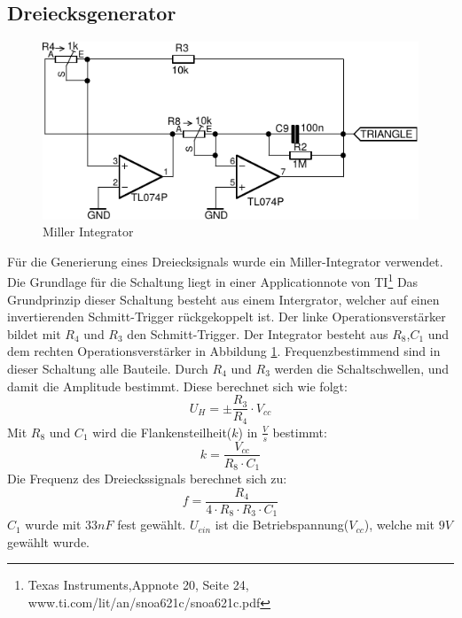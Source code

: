 \subsection{Dreiecksgenerator}
\label{sec:miller}
\begin{figure}[H]
\centering
 \includegraphics[scale=1]{gfx/triangle_generator.pdf}
 \caption{Miller Integrator}
	\label{fig:triangle} 
\end{figure}
Für die Generierung eines Dreiecksignals wurde ein Miller-Integrator verwendet.
Die Grundlage für die Schaltung liegt in einer Applicationnote von TI\footnote{ Texas Instruments,Appnote 20, Seite 24, www.ti.com/lit/an/snoa621c/snoa621c.pdf}
Das Grundprinzip dieser Schaltung besteht aus einem Intergrator, welcher auf einen invertierenden Schmitt-Trigger rückgekoppelt ist.
Der linke Operationsverstärker bildet mit $R_4$ und $R_3$ den Schmitt-Trigger. Der Integrator besteht aus $R_8$,$C_1$ und dem rechten Operationsverstärker in Abbildung \ref{fig:triangle}.
Frequenzbestimmend sind in dieser Schaltung alle Bauteile. Durch $R_4$ und $R_3$ werden die Schaltschwellen, und damit die Amplitude bestimmt. Diese berechnet sich wie folgt: 
\begin{equation}
U_H = \pm\frac{R_3}{R_4}\cdot V_{cc}
\end{equation}
Mit $R_8$ und $C_1$ wird die Flankensteilheit($k$) in $\frac{V}{s}$ bestimmt:
\begin{equation}
k=\frac{V_{cc}}{R_8 \cdot C_1}
\end{equation}
Die Frequenz des Dreieckssignals berechnet sich zu:
\begin{equation}
f = \frac{R_4}{4 \cdot R_8 \cdot R_3 \cdot C_1}
\end{equation}
$C_1$ wurde mit $33nF$ fest gewählt. $U_{ein}$ ist die Betriebspannung($V_{cc}$), welche mit $9V$ gewählt wurde.